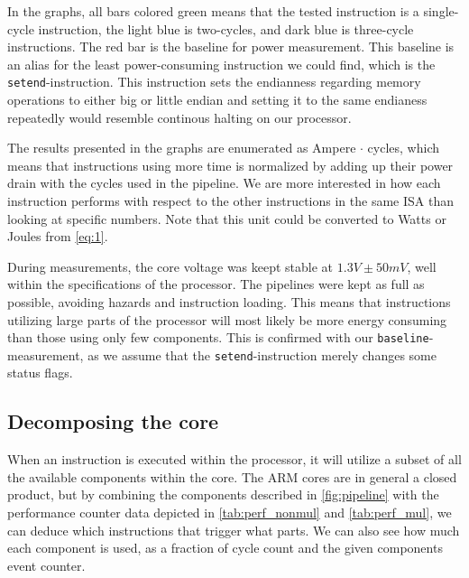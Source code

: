 In the graphs, all bars colored green means that the tested instruction is a
single-cycle instruction, the light blue is two-cycles, and dark blue is
three-cycle instructions. The red bar is the baseline for power measurement.
This baseline is an alias for the least power-consuming instruction we could
find, which is the \texttt{setend}-instruction. This instruction sets the
endianness regarding memory operations to either big or little
endian \cite{armcompilerref} and setting it to the same endianess repeatedly
would resemble continous halting on our processor.

The results presented in the graphs are enumerated as Ampere $\cdot$ cycles,
which means that instructions using more time is normalized by adding up their
power drain with the cycles used in the pipeline. We are more interested in how
each instruction performs with respect to the other instructions in the same ISA
than looking at specific numbers. Note that this unit could be converted to
Watts or Joules from \autoref{eq:1}.

During measurements, the core voltage was keept stable at $1.3V\pm50mV$, well
within the specifications of the processor. The pipelines were kept as full as
possible, avoiding hazards and instruction loading. This means that instructions
utilizing large parts of the processor will most likely be more energy consuming
than those using only few components. This is confirmed with our
\texttt{baseline}-measurement, as we assume that the \texttt{setend}-instruction
merely changes some status flags.

\subsection{Decomposing the core}
When an instruction is executed within the processor, it will utilize a subset
of all the available components within the core. The ARM cores are in general a
closed product, but by combining the components described in
\autoref{fig:pipeline} with the performance counter data depicted in
\autoref{tab:perf_nonmul} and \autoref{tab:perf_mul}, we can deduce which
instructions that trigger what parts. We can also see how much each component is
used, as a fraction of cycle count and the given components event counter.

